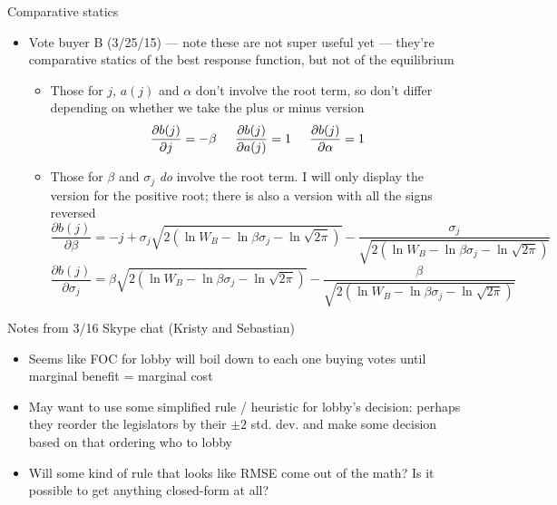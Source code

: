 \documentclass[12pt]{article}
\begin{document}
\newpage
Comparative statics
\begin{itemize}
	\item Vote buyer B (3/25/15) --- note these are not super useful yet --- they're comparative statics of the best response function, but not of the equilibrium
		\begin{itemize}
			\item Those for $j$, $a(j)$ and $\alpha$ don't involve the root term, so don't differ depending on whether we take the plus or minus version
				\[
					\frac{\partial b(j)}{\partial j} = -\beta \hskip.2in \frac{\partial b(j)}{\partial a(j)} = 1 \hskip.2in \frac{\partial b(j)}{\partial \alpha} = 1
				\]
			\item Those for $\beta$ and $\sigma_j$ \textit{do} involve the root term. I will only display the version for the positive root; there is also a version with all the signs reversed
				\[
				  \frac{\partial b(j)}{\partial \beta} = -j + \sigma_j \sqrt{2 \left(\ln W_B - \ln \beta\sigma_j - \ln \sqrt{2\pi} \right)} - \frac{\sigma_j}{\sqrt{2 \left(\ln W_B - \ln \beta\sigma_j - \ln \sqrt{2\pi} \right)}}
				\]
				\[
				  \frac{\partial b(j)}{\partial \sigma_j} = \beta \sqrt{2 \left(\ln W_B - \ln \beta\sigma_j - \ln \sqrt{2\pi} \right)} - \frac{\beta}{\sqrt{2 \left(\ln W_B - \ln \beta\sigma_j - \ln \sqrt{2\pi} \right)}}
				\]
		\end{itemize}
\end{itemize}


				  
		

\newpage
Notes from 3/16 Skype chat (Kristy and Sebastian)
\begin{itemize}
	\item Seems like FOC for lobby will boil down to each one buying votes until marginal benefit = marginal cost
	\item May want to use some simplified rule / heuristic for lobby's decision: perhaps they reorder the legislators by their $\pm 2$ std. dev. and make some decision based on that ordering who to lobby
	\item Will some kind of rule that looks like RMSE come out of the math? Is it possible to get anything closed-form at all?
\end{itemize}
\end{document}
